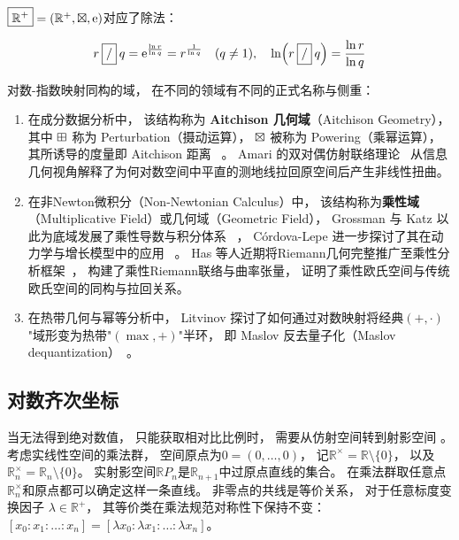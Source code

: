 ﻿\documentclass[10pt,a4paper]{article}
\numberwithin{equation}{section}
\begin{document}
$\boxed{\mathbb R^+} = (\mathbb R^+,\mathbin{\boxtimes},\text e)$对应了除法：

\begin{equation*}
r \mathbin{\boxed{/}} q = \text{e}^{\frac{\ln r}{\ln q}} = r^{\frac{1}{\ln q}} \quad (q \neq 1),\quad
\ln(r \mathbin{\boxed{/}} q) = \frac{\ln r}{\ln q}
\end{equation*}

对数-指数映射同构的域，
在不同的领域有不同的正式名称与侧重：
\begin{enumerate}
  \item 
  在成分数据分析中，
  该结构称为  \textbf{Aitchison 几何域}（Aitchison Geometry），
  其中 $\mathbin{\boxplus}$ 称为 Perturbation（摄动运算），
  $\mathbin{\boxtimes}$ 被称为 Powering（乘幂运算），
  其所诱导的度量即 Aitchison 距离~
  \cite{Aitchison1986,PawlowskyGlahnEgozcue2001}。
  Amari 的双对偶仿射联络理论~\cite{Amari2016} 
  从信息几何视角解释了为何对数空间中平直的测地线拉回原空间后产生非线性扭曲。

  \item 
  在非Newton微积分（Non-Newtonian Calculus）中，
  该结构称为\textbf{乘性域}（Multiplicative Field）或几何域（Geometric Field），
  Grossman 与 Katz 以此为底域发展了乘性导数与积分体系~
  \cite{GrossmanKatz1972}，
  Córdova-Lepe 进一步探讨了其在动力学与增长模型中的应用~
  \cite{CordovaLepe2006}。
  Has 等人近期将Riemann几何完整推广至乘性分析框架~\cite{Has2026}，
  构建了乘性Riemann联络与曲率张量，
  证明了乘性欧氏空间与传统欧氏空间的同构与拉回关系。

  \item 
  在热带几何与幂等分析中，
  Litvinov 探讨了如何通过对数映射将经典$(+,\cdot)$"域形变为热带"$(\max,+)$"半环，
  即 Maslov 反去量子化（Maslov dequantization）~\cite{Litvinov2007}。
\end{enumerate}



\subsection{对数齐次坐标}

当无法得到绝对数值，
只能获取相对比比例时，
需要从仿射空间转到射影空间
\cite{Hartshorne1977}。
考虑实线性空间的乘法群，
空间原点为$0=(0,\ldots,0)$，
记$\mathbb R^\times = \mathbb R \setminus \{0\}$，
以及$\mathbb R_n^\times = \mathbb R_n \setminus \{0\}$。
实射影空间$\mathbb R P_n$是$\mathbb R_{n+1}$中过原点直线的集合。
在乘法群取任意点$\mathbb R_n^\times$和原点都可以确定这样一条直线。
非零点的共线是等价关系，
对于任意标度变换因子 $\lambda \in \mathbb{R}^+$，
其等价类在乘法规范对称性下保持不变：
$[x_0 : x_1 : \ldots : x_n] = [\lambda x_0 : \lambda x_1 : \ldots : \lambda x_n]$。
\end{document}

